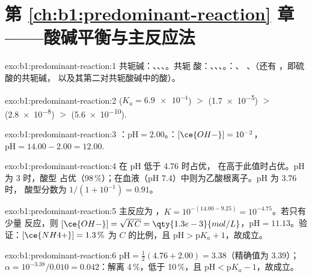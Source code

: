 \section*{第 \ref{ch:b1:predominant-reaction} 章——酸碱平衡与主反应法}

\begin{solution}{exo:b1:predominant-reaction:1}
共轭碱：、、、。共轭
酸：、、、。：、
、（还有 ，即硫酸的共轭碱，
以及其第二对共轭酸碱中的酸）。
\end{solution}

\begin{solution}{exo:b1:predominant-reaction:2}
 ($K_a = \num{6.9e-4}$) $>$  (\num{1.7e-5}) $>$ 
(\num{2.8e-8}) $>$  (\num{5.6e-10}).
\end{solution}

\begin{solution}{exo:b1:predominant-reaction:3}
：$\mathrm{pH} = 2.00$。：$[\ce{OH-}] = 10^{-2}$，
$\mathrm{pH} = 14.00 - 2.00 = 12.00$.
\end{solution}

\begin{solution}{exo:b1:predominant-reaction:4}
 在 pH 低于 4.76 时占优， 在高于此值时占优。pH 为 3 时，酸型
占优（98\,\%）；在血液（pH 7.4）中则为乙酸根离子。pH 为 3.76 时，
酸型分数为 $1/(1 + 10^{-1}) = 0.91$。
\end{solution}

\begin{solution}{exo:b1:predominant-reaction:5}
主反应为 ，$K = 10^{-(14.00 -
9.25)} = 10^{-4.75}$。若只有少量  反应，则 $[\ce{OH-}] = \sqrt{K C} =
\qty{1.3e-3}{mol/L}$，$\mathrm{pH} = 11.13$。验证：$[\ce{NH4+}] = 1.3\,\%$
为 $C$ 的比例，且 $\mathrm{pH} > \mathrm{p}K_a + 1$，故成立。
\end{solution}

\begin{solution}{exo:b1:predominant-reaction:6}
$\mathrm{pH} = \frac12(4.76 + 2.00) = 3.38$（精确值为 3.39）；
$\alpha = 10^{-3.38}/0.010 = 0.042$：解离 4\,\%，低于 10\,\%，且
$\mathrm{pH} < \mathrm{p}K_a - 1$，故成立。
\end{solution}

